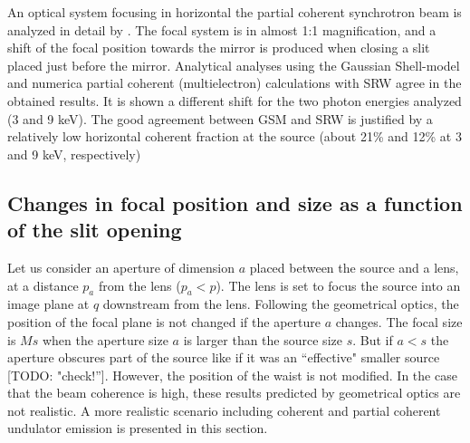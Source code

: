 \documentclass{iucr}              %
\newcommand{\todo}[1]{{\color{red}[TODO: "#1'']}}
\begin{document}
An optical system focusing in horizontal the partial coherent synchrotron beam is analyzed in detail by \cite{westfahl}. The focal system is in almost 1:1 magnification, and a shift of the focal position towards the mirror is produced when closing a slit placed just before the mirror. Analytical analyses using the Gaussian Shell-model and numerica partial coherent (multielectron) calculations with SRW \cite{codeSRW} agree in the obtained results. It is shown a different shift for the two photon energies analyzed (3 and 9 keV). The good agreement between GSM and SRW is justified by a relatively low horizontal coherent fraction at the source (about 21\% and 12\% at 3 and 9 keV, respectively)
 
 
 \subsection{Changes in focal position and size as a function of the slit opening}
 
Let us consider an aperture of dimension $a$ placed between the source and a lens, at a distance $p_a$ from the lens ($p_a < p$). The lens is set to focus the source into an image plane at $q$ downstream from the lens. Following the geometrical optics, the position of the focal plane is not changed if the aperture $a$ changes. The focal size is $Ms$  when the aperture size $a$ is larger than the source size $s$. But if $a<s$ the aperture obscures part of the source like if it was an ``effective" smaller source \todo{check!}. However, the position of the waist is not modified. In the case that the beam coherence is high, these results predicted by geometrical optics are not realistic. A more realistic scenario including coherent and partial coherent undulator emission is presented in this section. 

\end{document}
